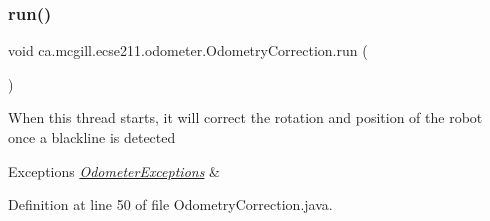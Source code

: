 \subsubsection{\texorpdfstring{run()}{run()}}
{\footnotesize\ttfamily void ca.\+mcgill.\+ecse211.\+odometer.\+Odometry\+Correction.\+run (\begin{DoxyParamCaption}{ }\end{DoxyParamCaption})}

When this thread starts, it will correct the rotation and position of the robot once a blackline is detected


\begin{DoxyExceptions}{Exceptions}
{\em \hyperlink{classca_1_1mcgill_1_1ecse211_1_1odometer_1_1_odometer_exceptions}{Odometer\+Exceptions}} & \\
\hline
\end{DoxyExceptions}


Definition at line 50 of file Odometry\+Correction.\+java.


